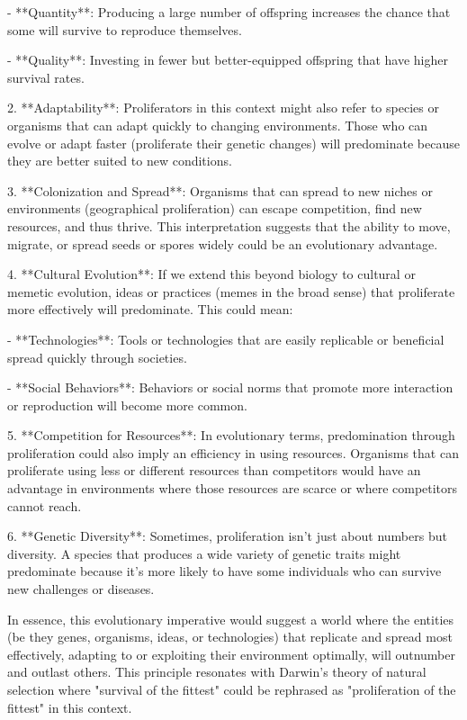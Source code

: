 \documentclass[12pt,titlepage]{book}
\begin{document}
   - **Quantity**: Producing a large number of offspring increases the chance that some will survive to reproduce themselves.
   
   - **Quality**: Investing in fewer but better-equipped offspring that have higher survival rates.

2. **Adaptability**: Proliferators in this context might also refer to species or organisms that can adapt quickly to changing environments. Those who can evolve or adapt faster (proliferate their genetic changes) will predominate because they are better suited to new conditions.

3. **Colonization and Spread**: Organisms that can spread to new niches or environments (geographical proliferation) can escape competition, find new resources, and thus thrive. This interpretation suggests that the ability to move, migrate, or spread seeds or spores widely could be an evolutionary advantage.

4. **Cultural Evolution**: If we extend this beyond biology to cultural or memetic evolution, ideas or practices (memes in the broad sense) that proliferate more effectively will predominate. This could mean:

   - **Technologies**: Tools or technologies that are easily replicable or beneficial spread quickly through societies.
   
   - **Social Behaviors**: Behaviors or social norms that promote more interaction or reproduction will become more common.

5. **Competition for Resources**: In evolutionary terms, predomination through proliferation could also imply an efficiency in using resources. Organisms that can proliferate using less or different resources than competitors would have an advantage in environments where those resources are scarce or where competitors cannot reach.

6. **Genetic Diversity**: Sometimes, proliferation isn't just about numbers but diversity. A species that produces a wide variety of genetic traits might predominate because it's more likely to have some individuals who can survive new challenges or diseases.

In essence, this evolutionary imperative would suggest a world where the entities (be they genes, organisms, ideas, or technologies) that replicate and spread most effectively, adapting to or exploiting their environment optimally, will outnumber and outlast others. This principle resonates with Darwin's theory of natural selection where "survival of the fittest" could be rephrased as "proliferation of the fittest" in this context.
\end{document}
